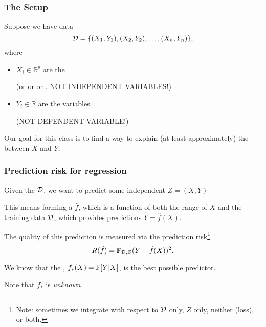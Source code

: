 \documentclass{beamer}
\begin{document}
\title{}
\subtitle{\classTitle}
\date{}



\begin{frame}
\maketitle
%
\organization
%
\end{frame}

\begin{frame}
\frametitle{The Setup}
Suppose we have data 
\[
\data = \{ (X_1 , Y_1), (X_2 , Y_2), \ldots, (X_n , Y_n) \},
\]
where 
\begin{itemize}
	\item $X_i \in \mathbb{R}^p$  are the  

	{\scriptsize (or  or  or .  NOT INDEPENDENT VARIABLES!)}
\item $Y_i \in \mathbb{R}$ are the  variables.

	{\scriptsize (NOT DEPENDENT VARIABLE!)}
\end{itemize}
\vsp

Our goal for this class is to find a way to explain (at least approximately) the 
between $X$ and $Y$.
\vsp
\end{frame}

\begin{frame}
\frametitle{Prediction risk for regression}
Given the  $\data$, we want to predict some independent  $Z = (X,Y)$

\vsp
This means forming a $\hat f$, which is a function of both the range of $X$ and the training data $\data$, 
which provides predictions $\hat Y = \hat f(X)$.

\vsp
The quality of this prediction is measured via the prediction risk\footnote{ Note: sometimes we integrate with
respect to $\data$ only, $Z$ only, neither (loss), or both.}
\[
R(\hat{f}) = \P_{\data,Z}(Y - \hat{f}(X))^2.
\]

We know that the , $f_*(X) = \P[Y | X]$, is the best possible predictor.  


\vsp
Note that $f_*$ is {\it unknown}
\end{frame}
%
\end{document}
